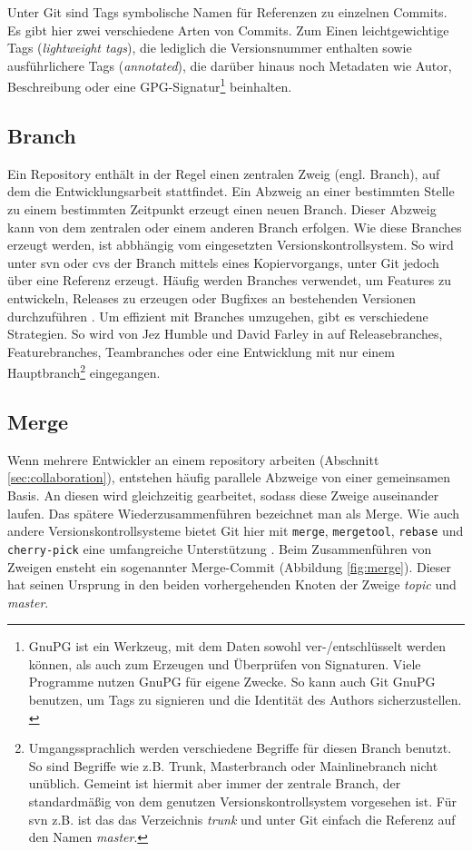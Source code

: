 Unter Git sind Tags symbolische Namen für Referenzen zu einzelnen Commits. Es
gibt hier zwei verschiedene Arten von Commits. Zum Einen leichtgewichtige Tags
(\textit{lightweight tags}), die lediglich die Versionsnummer enthalten sowie
ausführlichere Tags (\textit{annotated}), die darüber hinaus noch Metadaten wie
Autor, Beschreibung oder eine GPG-Signatur\footnote{GnuPG ist ein Werkzeug, mit
dem Daten sowohl ver-/entschlüsselt werden können, als auch zum Erzeugen und
Überprüfen von Signaturen. Viele Programme nutzen GnuPG für eigene Zwecke. So
kann auch Git GnuPG benutzen, um Tags zu signieren und die Identität des Authors
sicherzustellen. \cite{gnupg}}
beinhalten. \cite[S.~21]{gitosp}

\subsection{Branch}\label{sec:branch}
Ein Repository enthält in der Regel einen zentralen Zweig (engl. Branch),
auf dem die Entwicklungsarbeit stattfindet. Ein Abzweig an einer bestimmten
Stelle zu einem bestimmten Zeitpunkt erzeugt einen neuen Branch. Dieser
Abzweig kann von dem zentralen oder einem anderen Branch erfolgen. Wie diese
Branches erzeugt werden, ist abbhängig vom eingesetzten Versionskontrollsystem.
So wird unter \acrshort{svn} oder \acrshort{cvs} der Branch mittels
eines Kopiervorgangs, unter Git jedoch über eine Referenz erzeugt. Häufig
werden Branches verwendet, um Features zu entwickeln, Releases zu erzeugen oder
Bugfixes an bestehenden Versionen durchzuführen \cite[S.~21]{gitosp}. Um
effizient mit Branches umzugehen, gibt es verschiedene Strategien. So wird von
Jez Humble und David Farley in \cite[S.~408-412]{cd} auf Releasebranches,
Featurebranches, Teambranches oder eine Entwicklung mit nur einem
Hauptbranch\footnote{Umgangssprachlich werden verschiedene Begriffe für diesen
Branch benutzt. So sind Begriffe wie z.B. Trunk, Masterbranch oder
Mainlinebranch nicht unüblich. Gemeint ist hiermit aber immer der
zentrale Branch, der standardmäßig von dem genutzen Versionskontrollsystem vorgesehen
ist. Für \acrshort{svn} z.B. ist das das Verzeichnis
\textit{trunk} und unter Git einfach die Referenz auf den Namen
\textit{master}.} eingegangen.

\subsection{Merge}\label{sec:merge}
Wenn mehrere Entwickler an einem \gls{repository} arbeiten (Abschnitt
\ref{sec:collaboration}), entstehen häufig parallele Abzweige von einer
gemeinsamen Basis. An diesen wird gleichzeitig gearbeitet, sodass diese Zweige
auseinander laufen. Das spätere Wiederzusammenführen bezeichnet man als Merge.
Wie auch andere Versionskontrollsysteme bietet Git hier mit \texttt{merge},
\texttt{mergetool}, \texttt{rebase} und \texttt{cherry-pick} eine umfangreiche
Unterstützung \cite[S.~vii]{gitwf}. Beim Zusammenführen von Zweigen ensteht ein
sogenannter Merge-Commit (Abbildung \ref{fig:merge}). Dieser hat seinen
Ursprung in den beiden vorhergehenden Knoten der Zweige \textit{topic} und
\textit{master}.

